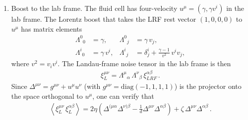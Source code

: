 \documentclass[12pt,aps,preprint,nofootinbib,noshowkeys,noshowpacs,longbibliography,superscriptaddress,tightenlines]{revtex4-2}
\def\llangle{\left\langle}
\def\rrangle{\right\rangle}
\begin{document}
\begin{enumerate}
\item Boost to the lab frame.
The fluid cell has four-velocity $u^\mu = (\gamma, \gamma v^i)$ in the lab frame.
The Lorentz boost that takes the LRF rest vector $(1,0,0,0)$ to $u^\mu$
has matrix elements
\begin{align}
  \Lambda^0{}_0 &= \gamma, &
  \Lambda^0{}_j &= \gamma\, v_j, \\
  \Lambda^i{}_0 &= \gamma\, v^i, &
  \Lambda^i{}_j &= \delta^i_j + \frac{\gamma - 1}{v^2}\,v^i v_j,
\end{align}
where $v^2 = v_i v^i$.
The Landau-frame noise tensor in the lab frame is then
\begin{align}
 \xi^{\mu\nu}_{L} = \Lambda^{\mu}{}_{\alpha}\, \Lambda^{\nu}{}_{\beta}\, \xi^{\alpha\beta}_{LRF}\,.
\end{align}
Since $\Delta^{\mu\nu} = g^{\mu\nu} + u^\mu u^\nu$ (with $g^{\mu\nu} = \mathrm{diag}(-1,1,1,1)$)
is the projector onto the space orthogonal to $u^\mu$, one can verify that
\begin{align}
  \llangle \xi^{\mu\nu}_{L}\, \xi^{\alpha\beta}_{L}  \rrangle
  = 2\eta\left(\Delta^{(\mu\alpha}\Delta^{\nu)\beta}
    - \frac{1}{d}\Delta^{\mu\nu}\Delta^{\alpha\beta}\right)
    + \zeta\,\Delta^{\mu\nu}\Delta^{\alpha\beta}\,.
\end{align}



\end{enumerate}
\end{document}
